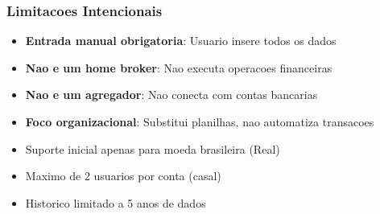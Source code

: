 \subsubsection{Limitacoes Intencionais}
\begin{itemize}
    \item \textbf{Entrada manual obrigatoria}: Usuario insere todos os dados
    \item \textbf{Nao e um home broker}: Nao executa operacoes financeiras
    \item \textbf{Nao e um agregador}: Nao conecta com contas bancarias
    \item \textbf{Foco organizacional}: Substitui planilhas, nao automatiza transacoes
    \item Suporte inicial apenas para moeda brasileira (Real)
    \item Maximo de 2 usuarios por conta (casal)
    \item Historico limitado a 5 anos de dados
\end{itemize}
